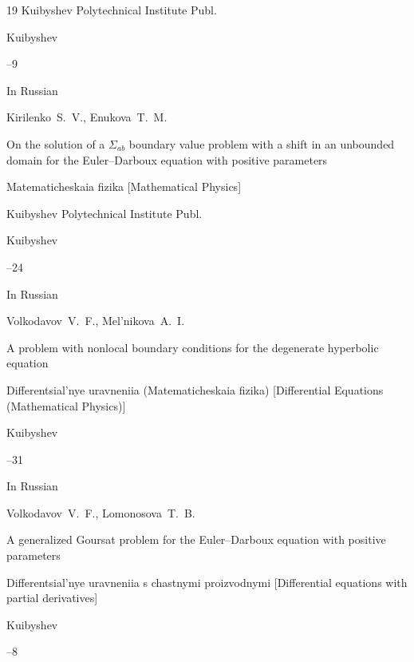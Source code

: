 \begin{thebibliography}{19}
\publ Kuibyshev  Polytechnical Institute Publ.

\publaddr Kuibyshev 


--9




\lang In Russian

\by Kirilenko~S.~V., Enukova~T.~M.

\paper On the solution of a $ \Sigma_ {ab} $ boundary value problem  with a shift in an unbounded domain for the Euler--Darboux equation with positive parameters

\inbook Matematicheskaia fizika \rm [Mathematical Physics]

\publ Kuibyshev  Polytechnical Institute Publ.

\publaddr Kuibyshev 


--24




\lang In Russian

\by Volkodavov~V.~F., Mel'nikova~A.~I.

\paper A problem with nonlocal boundary conditions for the degenerate hyperbolic equation

\inbook Differentsial'nye uravneniia (Matematicheskaia fizika) \rm  [Differential Equations (Mathematical Physics)]


\publaddr Kuibyshev 


--31






\lang In Russian

\by Volkodavov~V.~F., Lomonosova~T.~B.

\paper A generalized Goursat problem for the Euler--Darboux equation with positive parameters

\inbook Differentsial'nye uravneniia s chastnymi proizvodnymi \rm [Differential equations with partial derivatives]

\publaddr Kuibyshev 


--8





\end{thebibliography}
